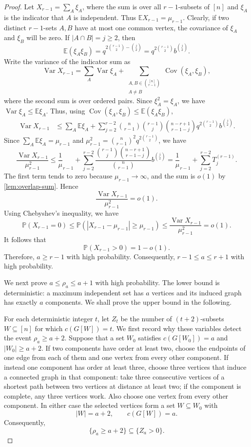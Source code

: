 \documentclass[11pt,reqno]{amsart}
\theoremstyle{definition}
\theoremstyle{remark}
\newcommand{\EE}{\mathbb E}
\newcommand{\PP}{\mathbb P}
\begin{document}
\begin{proof}
Let $X_{r-1}=\sum_A\xi_A$, where the sum is over all $r-1$-subsets of $[n]$ and
$\xi_A$ is the indicator that $A$ is independent.  Thus
$\EE X_{r-1}=\mu_{r-1}$.  Clearly, if two distinct $r-1$-sets $A,B$ have at most one common
vertex,  the covariance of $\xi_A$ and $\xi_B$  will be zero.  If
$|A\cap B|=j\ge2$, then
\[
 \EE(\xi_A\xi_B)
 =q^{2\binom{r-1}{2}-\binom j2}
 =q^{2\binom{r-1}{2}}b^{\binom j2}.
\]
Write the variance of the indicator sum as
\[
 \operatorname{Var}X_{r-1}
 =\sum_A\operatorname{Var}\xi_A
  +\sum_{\substack{A,B\in\binom{[n]}{r-1}\\A\ne B}}
    \operatorname{Cov}(\xi_A,\xi_B),
\]
where the second sum is over ordered pairs.  Since $\xi_A^2=\xi_A$, we have $ \operatorname{Var}\xi_A\leq\EE\xi_A$. Thus, using $\operatorname{Cov}(\xi_A,\xi_B)\leq\mathbb{E}(\xi_A\xi_B)$,
\begin{align*}
 \operatorname{Var}X_{r-1}
 &\le \sum_A\EE\xi_A
 +\sum_{j=2}^{r-2}
   \binom{n}{r-1}\binom{r-1}{j}\binom{n-r+1}{r-1-j}
   q^{2\binom{r-1}{2}} b^{\binom j2}.
\end{align*}
Since $\sum_A\EE\xi_A=\mu_{r-1}$ and
$\mu_{r-1}^2=\binom{n}{r-1}^2q^{2\binom{r-1}{2}}$, we have
\[
 \frac{\operatorname{Var}X_{r-1}}{\mu_{r-1}^2}
 \le\frac1\mu_{r-1}+
 \sum_{j=2}^{r-2}
 \frac{\binom{r-1}{j}\binom{n-r+1}{r-1-j}}{\binom{n}{r-1}}
 b^{\binom j2}
 =\frac1\mu_{r-1}+\sum_{j=2}^{r-2}T_j^{(r-1)}.
\]
The first term tends to zero because $\mu_{r-1}\to\infty$, and the sum is
$o(1)$ by \cref{lem:overlap-sum}.  Hence
\[
 \frac{\operatorname{Var}X_{r-1}}{\mu_{r-1}^2}=o(1).
\]
Using Chebyshev's inequality, we have
\[
 \PP\left(X_{r-1}=0\right)\leq
 \PP\left(\left|X_{r-1}-\mu_{r-1}\right|\ge\mu_{r-1}\right)
 \le \frac{\operatorname{Var}X_{r-1}}{\mu_{r-1}^2}=o(1).
\]
It follows that
\[
 \PP(X_{r-1}>0)=1-o(1).
\]
Therefore, $a\geq r-1$ with high probability.
Consequently, $r-1\leq a\leq r+1$ with high probability.



We next prove $a\leq\rho_a\leq a+1$ with high probability.  The lower
bound is deterministic: a maximum independent set has $a$ vertices and its
induced graph has exactly $a$ components. We shall prove the upper bound in the following.

For each deterministic integer $t$, let $Z_t$ be the number of
$(t+2)$-subsets $W\subseteq[n]$ for which $c(G[W])=t$.  We first record why
these variables detect the event $\rho_a\ge a+2$.  Suppose that a set
$W_0$ satisfies $c(G[W_0])=a$ and $|W_0|\ge a+2$.  
If two components have order at least two, choose the endpoints of one edge
from each of them and one vertex from every other component.  If instead one
component has order at least three, choose three vertices that induce a
connected graph in that component: take three consecutive vertices of a
shortest path between two vertices at distance at least two; if the component
is complete, any three vertices work.  Also choose one vertex from every other
component.  In either case the selected vertices form a set $W\subseteq W_0$
with
\[
 |W|=a+2,\qquad c(G[W])=a.
\]
Consequently,
\begin{equation}\label{eq:rho-detected-by-Z}
 \{\rho_a\ge a+2\}\subseteq\{Z_a>0\}.
\end{equation}


\end{proof}
\end{document}
